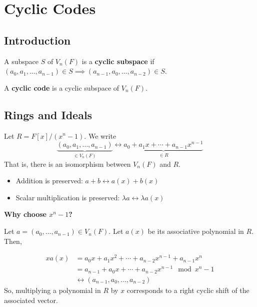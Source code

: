 \chapter{Cyclic Codes}
\section{Introduction}
\begin{defbox}
    \begin{definition}
        A subspace $ S $ of $ V_n(F) $ is a \textbf{cyclic subspace}
        if $ (a_0,a_1,\ldots ,a_{n-1})\in S\implies 
        (a_{n-1},a_0,\ldots , a_{n-2})\in S $.
    \end{definition}
\end{defbox}

\begin{defbox}
    \begin{definition}
        A \textbf{cyclic code} is a cyclic subspace of $ V_n(F) $.
    \end{definition}
\end{defbox}

\section{Rings and Ideals}

Let $ R=F[x]/(x^n-1) $. We write
\[ \underbrace{(a_0,a_1,\ldots ,a_{n-1})}_{\in V_n(F)}
\longleftrightarrow \underbrace{{a_0+a_1x+\cdots+a_{n-1}}x^{n-1}}_{\in R} \]
That is, there is an isomorphism between $ V_n(F) $ and $ R $.
\begin{itemize}
    \item Addition is preserved: $ a+b\longleftrightarrow a(x)+b(x) $
    \item Scalar multiplication is preserved: $ \lambda a \longleftrightarrow \lambda a(x) $
\end{itemize}
\textbf{Why choose $ x^n -1$?}

Let $ a=(a_0,\ldots ,a_{n-1})\in V_n(F) $. Let $ a(x) $ be its associative
polynomial in $ R $. Then,

\begin{align*}
    x a(x)
    &=a_0x+a_1x^2+\cdots+a_{n-2}x^{n-1}+a_{n-1}x^n\\
    &= a_{n-1}+a_0x+\cdots+a_{n-2}x^{n-1} \mod x^n -1\\
    &\longleftrightarrow (a_{n-1},a_0,\ldots ,a_{n-2})
\end{align*}
So, multiplying a polynomial in $ R $ by $ x $ corresponds
to a right cyclic shift of the associated vector.

